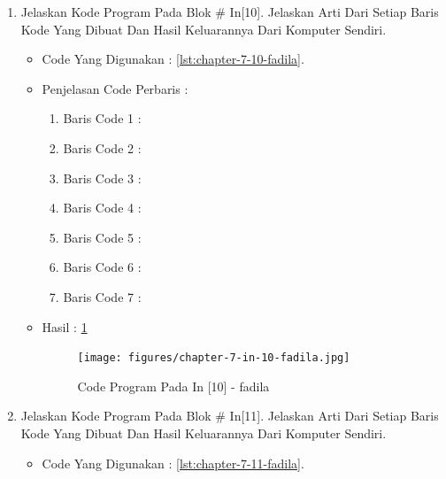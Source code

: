 \begin{enumerate}
\begin{itemize}
\par
\par
\end{itemize}
\par
\par
\par
\item Jelaskan Kode Program Pada Blok \# In[10]. Jelaskan Arti Dari Setiap Baris Kode Yang Dibuat Dan Hasil Keluarannya Dari Komputer Sendiri.
\begin{itemize}
\item Code Yang Digunakan : \ref{lst:chapter-7-10-fadila}.

\par
\par
\item Penjelasan Code Perbaris	: 
\begin{enumerate}
\item Baris Code 1	:
\item Baris Code 2	:
\item Baris Code 3	:
\item Baris Code 4	:
\item Baris Code 5	:
\item Baris Code 6	:
\item Baris Code 7	:
\end{enumerate}
\par
\item Hasil : \ref{chapter-7-in-10-fadila}
\par
\par
\begin{figure}[!hbtp]
\centering
\texttt{[image: figures/chapter-7-in-10-fadila.jpg]}
\caption{Code Program Pada In [10] - fadila}
\label{chapter-7-in-10-fadila}
\end{figure}
\par
\par
\end{itemize}
\par
\par
\par
\item Jelaskan Kode Program Pada Blok \# In[11]. Jelaskan Arti Dari Setiap Baris Kode Yang Dibuat Dan Hasil Keluarannya Dari Komputer Sendiri.
\begin{itemize}
\item Code Yang Digunakan : \ref{lst:chapter-7-11-fadila}.


\end{itemize}
\end{enumerate}
